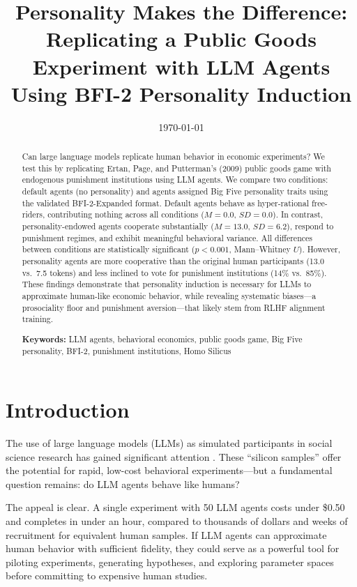 \documentclass[12pt, a4paper]{article}
\title{Personality Makes the Difference: Replicating a Public Goods Experiment with LLM Agents Using BFI-2 Personality Induction}
\author{
}
\date{\today}
\begin{document}
\maketitle

\begin{abstract}
Can large language models replicate human behavior in economic experiments? We test this by replicating Ertan, Page, and Putterman's (2009) public goods game with endogenous punishment institutions using LLM agents. We compare two conditions: default agents (no personality) and agents assigned Big Five personality traits using the validated BFI-2-Expanded format. Default agents behave as hyper-rational free-riders, contributing nothing across all conditions ($M = 0.0$, $SD = 0.0$). In contrast, personality-endowed agents cooperate substantially ($M = 13.0$, $SD = 6.2$), respond to punishment regimes, and exhibit meaningful behavioral variance. All differences between conditions are statistically significant ($p < 0.001$, Mann--Whitney $U$). However, personality agents are more cooperative than the original human participants (13.0 vs.\ 7.5 tokens) and less inclined to vote for punishment institutions (14\% vs.\ 85\%). These findings demonstrate that personality induction is necessary for LLMs to approximate human-like economic behavior, while revealing systematic biases---a prosociality floor and punishment aversion---that likely stem from RLHF alignment training.

\medskip
\noindent\textbf{Keywords:} LLM agents, behavioral economics, public goods game, Big Five personality, BFI-2, punishment institutions, Homo Silicus
\end{abstract}

\section{Introduction}

The use of large language models (LLMs) as simulated participants in social science research has gained significant attention \citep{horton2023homo, aher2023turing, argyle2023out}. These ``silicon samples'' offer the potential for rapid, low-cost behavioral experiments---but a fundamental question remains: do LLM agents behave like humans?

The appeal is clear. A single experiment with 50 LLM agents costs under \$0.50 and completes in under an hour, compared to thousands of dollars and weeks of recruitment for equivalent human samples. If LLM agents can approximate human behavior with sufficient fidelity, they could serve as a powerful tool for piloting experiments, generating hypotheses, and exploring parameter spaces before committing to expensive human studies.
\end{document}

